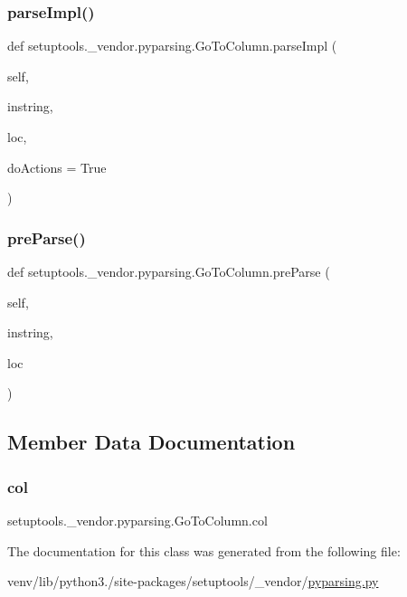 \subsubsection{\texorpdfstring{parse\+Impl()}{parseImpl()}}
{\footnotesize\ttfamily def setuptools.\+\_\+vendor.\+pyparsing.\+Go\+To\+Column.\+parse\+Impl (\begin{DoxyParamCaption}\item[{}]{self,  }\item[{}]{instring,  }\item[{}]{loc,  }\item[{}]{do\+Actions = {\ttfamily True} }\end{DoxyParamCaption})}

\mbox{\label{classsetuptools_1_1__vendor_1_1pyparsing_1_1GoToColumn_aaad80f703431014740cde9a81e8c429b}} 
\subsubsection{\texorpdfstring{pre\+Parse()}{preParse()}}
{\footnotesize\ttfamily def setuptools.\+\_\+vendor.\+pyparsing.\+Go\+To\+Column.\+pre\+Parse (\begin{DoxyParamCaption}\item[{}]{self,  }\item[{}]{instring,  }\item[{}]{loc }\end{DoxyParamCaption})}



\subsection{Member Data Documentation}
\mbox{\label{classsetuptools_1_1__vendor_1_1pyparsing_1_1GoToColumn_a206e08317a2119283a789c01645505d9}} 
\subsubsection{\texorpdfstring{col}{col}}
{\footnotesize\ttfamily setuptools.\+\_\+vendor.\+pyparsing.\+Go\+To\+Column.\+col}



The documentation for this class was generated from the following file\+:\begin{DoxyCompactItemize}
\item 
venv/lib/python3./site-\/packages/setuptools/\+\_\+vendor/\hyperlink{setuptools_2__vendor_2pyparsing_8py}{pyparsing.\+py}\end{DoxyCompactItemize}
